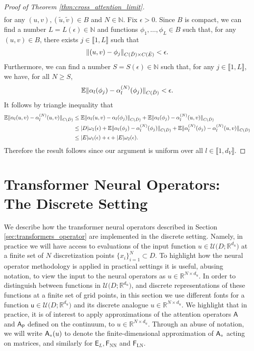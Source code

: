 \documentclass[twoside]{article}
\newcommand{\1}{\mathbbm{1}}
\newcommand{\R}{\mathbbm{R}}
\newcommand{\cU}{\mathcal{U}}
\newcommand{\sA}{\mathsf{A}}
\newcommand{\sAp}{\mathsf{A}_{\mathsf{P}}}
\newcommand{\sF}{\mathsf{F}}
\newcommand{\sE}{\mathsf{E}}
\newcommand{\su}{\mathsf{u}}
\newcommand{\placeholder}{\mathord{\color{black!33}\bullet}}
\newcommand{\range}[2]{\llbracket #1, #2 \rrbracket}
\providecommand{\mathbbm}{\mathbb} %
\newcommand{\E}{\mathbb{E}}
\begin{document}
\begin{proof}[Proof of Theorem \ref{thm:cross_attention_limit}]
\[\begin{aligned}
\end{aligned}
\]
for any $(u,v), (\widetilde{u},\widetilde{v}) \in B$ and $N \in \mathbb{N}$. Fix $\epsilon > 0$. Since $B$ is compact, we can find a number $L = L (\epsilon) \in \mathbb{N}$ and functions $\phi_1, \dots, \phi_L \in B$ such that, for any $(u,v) \in B$, there exists $j \in \range{1}{L}$ such that
\[\|(u,v) - \phi_j\|_{C(\Bar{D})\times C(\Bar{E})} < \epsilon.\]
Furthermore, we can find a number $S = S(\epsilon) \in \mathbb{N}$ such that, for any $j \in \range{1}{L}$, we have, for all $N \geq S$,
\[\E \|\alpha_l(\phi_j) - \alpha_l^{(N)} (\phi_j)\|_{C(\Bar{D})} < \epsilon.\]
It follows by triangle inequality that
\begin{align*}
    \E \|\alpha_l (u,v) - \alpha_l^{(N)}(u,v)\|_{C(\Bar{D})} &\leq \E \|\alpha_l (u,v) - \alpha_l(\phi_j)\|_{C(\Bar{D})} + \E \|\alpha_l(\phi_j) - \alpha_l^{(N)}(u,v)\|_{C(\Bar{D})} \\
    &\leq |D| \omega_1(\epsilon) + \E \|\alpha_l(\phi_j) - \alpha_l^{(N)}(\phi_j)\|_{C(\Bar{D})} + \E \|\alpha_l^{(N)}(\phi_j) - \alpha_l^{(N)}(u,v)\|_{C(\Bar{D})} \\
    &\leq |E| \omega_1(\epsilon) + \epsilon + |E| \omega_2(\epsilon).
\end{align*}
Therefore the result follows since our argument is uniform over all $l \in \range{1}{d_V}$.
\end{proof}

\section{Transformer Neural Operators: The Discrete Setting}

We describe how the transformer neural operators described in Section \ref{sec:transformers_operator} are implemented in the discrete setting. Namely, in practice we will have access to evaluations of the input function $u\in \cU\bigl(D;\R^{d_u} \bigr)$ at a finite set of $N$ discretization points $\{x_i\}_{i=1}^N\subset D$. To highlight how the neural operator methodology is applied in practical settings it is useful, abusing notation, to view the input
to the neural operators as $u\in \R^{N\times d_u}$. In order to distinguish between functions in $\cU\bigl(D;\R^{d_u} \bigr)$, and discrete representations of these functions at a finite set of grid points, in this section we use different fonts for a function $\su\in\cU\bigl(D;\R^{d_u} \bigr)$ and its discrete analogue $u\in \R^{N\times d_u}$. We highlight that in practice, it is of interest to apply approximations of the attention operators $\sA$ and $\sAp$ defined on the continuum, to $u\in \R^{N\times d_u}$. Through an abuse of notation, we will write $\sA_{\placeholder}(u)$ to denote the finite-dimensional approximation of $\sA_{\placeholder}$ acting on matrices, and similarly for $\sE_L, \sF_{\textrm{NN}}$ and $\sF_{\textrm{LN}}.$
\end{document}
